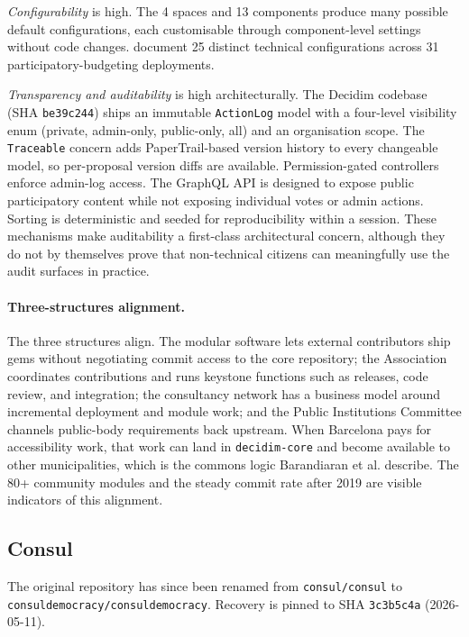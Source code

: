 \documentclass[11pt,a4paper]{article}
\begin{document}
\emph{Configurability} is high. The 4 spaces and 13 components produce many possible default configurations, each customisable through component-level settings without code changes. \citet{palacin2024configurations} document 25 distinct technical configurations across 31 participatory-budgeting deployments.

\emph{Transparency and auditability} is high architecturally. The Decidim codebase (SHA \texttt{be39c244}) ships an immutable \texttt{ActionLog} model with a four-level visibility enum (private, admin-only, public-only, all) and an organisation scope. The \texttt{Traceable} concern adds PaperTrail-based version history to every changeable model, so per-proposal version diffs are available. Permission-gated controllers enforce admin-log access. The GraphQL API is designed to expose public participatory content while not exposing individual votes or admin actions. Sorting is deterministic and seeded for reproducibility within a session. These mechanisms make auditability a first-class architectural concern, although they do not by themselves prove that non-technical citizens can meaningfully use the audit surfaces in practice.

\paragraph{Three-structures alignment.}
The three structures align. The modular software lets external contributors ship gems without negotiating commit access to the core repository; the Association coordinates contributions and runs keystone functions such as releases, code review, and integration; the consultancy network has a business model around incremental deployment and module work; and the Public Institutions Committee channels public-body requirements back upstream. When Barcelona pays for accessibility work, that work can land in \texttt{decidim-core} and become available to other municipalities, which is the commons logic Barandiaran et al. describe. The 80+ community modules and the steady commit rate after 2019 are visible indicators of this alignment.


\subsection{Consul}\label{sec:application-consul}

The original repository has since been renamed from \texttt{consul/consul} to \texttt{consuldemocracy/\allowbreak consuldemocracy}. Recovery is pinned to SHA \texttt{3c3b5c4a} (2026-05-11).
\end{document}
